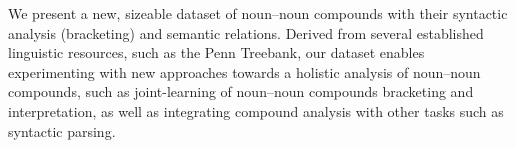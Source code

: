 We present a new, sizeable dataset of noun--noun compounds with their syntactic analysis (bracketing) and semantic relations. Derived from several established linguistic resources, such as the Penn Treebank, our dataset enables experimenting with new approaches towards a holistic analysis of noun--noun compounds, such as joint-learning of noun--noun compounds bracketing and interpretation, as well as integrating compound analysis with other tasks such as syntactic parsing.
